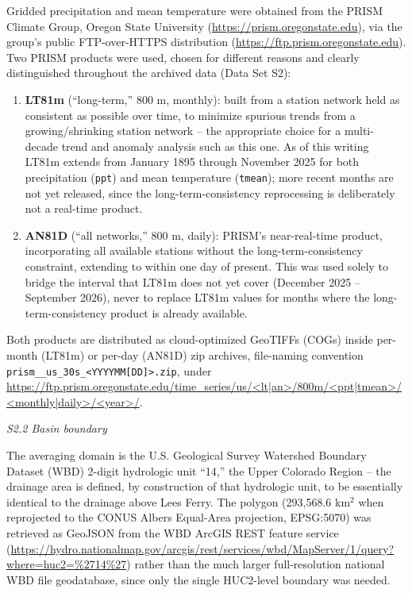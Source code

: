 \documentclass[draft,grl]{agutexSI2019}
\begin{document}
\begin{article}
Gridded precipitation and mean temperature were obtained from the PRISM Climate Group, Oregon State University \cite{prism2026,daly2008} (\url{https://prism.oregonstate.edu}), via the group's public FTP-over-HTTPS distribution (\url{https://ftp.prism.oregonstate.edu}). Two PRISM products were used, chosen for different reasons and clearly distinguished throughout the archived data (Data Set S2):
\begin{enumerate}
\item \textbf{LT81m} (``long-term,'' 800 m, monthly): built from a station network held as consistent as possible over time, to minimize spurious trends from a growing/shrinking station network -- the appropriate choice for a multi-decade trend and anomaly analysis such as this one. As of this writing LT81m extends from January 1895 through November 2025 for both precipitation (\texttt{ppt}) and mean temperature (\texttt{tmean}); more recent months are not yet released, since the long-term-consistency reprocessing is deliberately not a real-time product.
\item \textbf{AN81D} (``all networks,'' 800 m, daily): PRISM's near-real-time product, incorporating all available stations without the long-term-consistency constraint, extending to within one day of present. This was used solely to bridge the interval that LT81m does not yet cover (December 2025 -- September 2026), never to replace LT81m values for months where the long-term-consistency product is already available.
\end{enumerate}
Both products are distributed as cloud-optimized GeoTIFFs (COGs) inside per-month (LT81m) or per-day (AN81D) zip archives, file-naming convention \texttt{prism\_<ppt|tmean>\_us\_30s\_<YYYYMM[DD]>.zip}, under \url{https://ftp.prism.oregonstate.edu/time_series/us/<lt|an>/800m/<ppt|tmean>/<monthly|daily>/<year>/}.

\noindent\textit{S2.2 Basin boundary}

The averaging domain is the U.S. Geological Survey Watershed Boundary Dataset (WBD) 2-digit hydrologic unit ``14,'' the Upper Colorado Region \cite{usgs_wbd} -- the drainage area is defined, by construction of that hydrologic unit, to be essentially identical to the drainage above Lees Ferry. The polygon (293{,}568.6 km$^2$ when reprojected to the CONUS Albers Equal-Area projection, EPSG:5070) was retrieved as GeoJSON from the WBD ArcGIS REST feature service (\url{https://hydro.nationalmap.gov/arcgis/rest/services/wbd/MapServer/1/query?where=huc2=\%2714\%27}) rather than the much larger full-resolution national WBD file geodatabase, since only the single HUC2-level boundary was needed.


\end{article}
\end{document}
